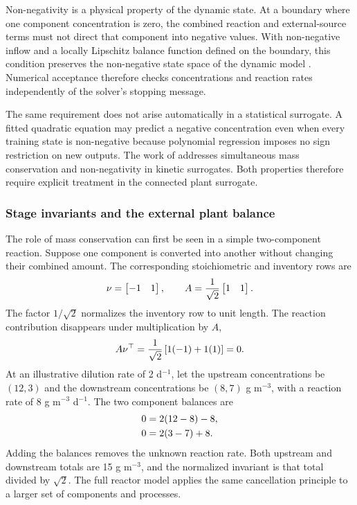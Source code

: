 Non-negativity is a physical property of the dynamic state. At a boundary where one component concentration is zero, the combined reaction and external-source terms must not direct that component into negative values. With non-negative inflow and a locally Lipschitz balance function defined on the boundary, this condition preserves the non-negative state space of the dynamic model \citep{Haddad2010}. Numerical acceptance therefore checks concentrations and reaction rates independently of the solver's stopping message.

The same requirement does not arise automatically in a statistical surrogate. A fitted quadratic equation may predict a negative concentration even when every training state is non-negative because polynomial regression imposes no sign restriction on new outputs. The work of \citet{KircherVotsmeier2025} addresses simultaneous mass conservation and non-negativity in kinetic surrogates. Both properties therefore require explicit treatment in the connected plant surrogate.

\subsubsection{Stage invariants and the external plant balance}

The role of mass conservation can first be seen in a simple two-component reaction. Suppose one component is converted into another without changing their combined amount. The corresponding stoichiometric and inventory rows are
\begin{equation}
\equationname{Illustrative stoichiometric matrix and normalized invariant row}
\nu=\begin{bmatrix}-1&1\end{bmatrix},\qquad
A=\frac1{\sqrt2}\begin{bmatrix}1&1\end{bmatrix}.
\end{equation}
The factor $1/\sqrt2$ normalizes the inventory row to unit length. The reaction contribution disappears under multiplication by $A$,
\begin{equation}
\equationname{Illustrative cancellation of the reaction contribution to an invariant}
A\nu^\top=\frac1{\sqrt2}\left[1(-1)+1(1)\right]=0.
\end{equation}
At an illustrative dilution rate of 2 d$^{-1}$, let the upstream concentrations be $(12,3)$ and the downstream concentrations be $(8,7)$ g m$^{-3}$, with a reaction rate of 8 g m$^{-3}$ d$^{-1}$. The two component balances are
\begin{align}
\equationname{Illustrative steady-state equation for the consumed component}
0&=2(12-8)-8,\\
\equationname{Illustrative steady-state equation for the produced component}
0&=2(3-7)+8.
\end{align}
Adding the balances removes the unknown reaction rate. Both upstream and downstream totals are 15 g m$^{-3}$, and the normalized invariant is that total divided by $\sqrt2$. The full reactor model applies the same cancellation principle to a larger set of components and processes.

